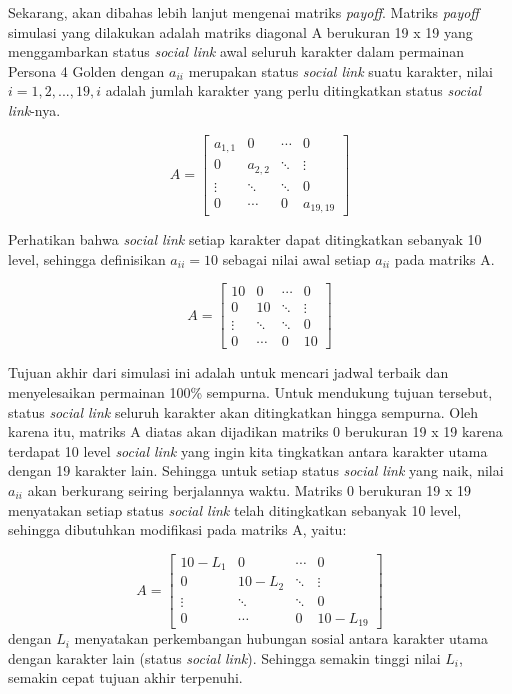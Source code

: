Sekarang, akan dibahas lebih lanjut mengenai matriks \textit{payoff}. Matriks \textit{payoff} simulasi yang dilakukan adalah matriks diagonal A berukuran 19 x 19 yang menggambarkan status \textit{social link} awal seluruh karakter dalam permainan Persona 4 Golden dengan $a_{ii}$ merupakan status \textit{social link} suatu karakter, nilai $i = 1,2,...,19, i$ adalah jumlah karakter yang perlu ditingkatkan status \textit{social link}-nya.

\[
    A =
    \begin{bmatrix}
        a_{1,1} & 0       & \cdots & 0         \\
        0       & a_{2,2} & \ddots & \vdots    \\
        \vdots  & \ddots  & \ddots & 0         \\
        0       & \cdots  & 0      & a_{19,19}
    \end{bmatrix}
\]

Perhatikan bahwa \textit{social link} setiap karakter dapat ditingkatkan sebanyak 10 level, sehingga definisikan $a_{ii}= 10$ sebagai nilai awal setiap $a_{ii}$ pada matriks A.

\[
    A =
    \begin{bmatrix}
        10     & 0      & \cdots & 0      \\
        0      & 10     & \ddots & \vdots \\
        \vdots & \ddots & \ddots & 0      \\
        0      & \cdots & 0      & 10
    \end{bmatrix}
\]

Tujuan akhir dari simulasi ini adalah untuk mencari jadwal terbaik dan menyelesaikan permainan 100\% sempurna. Untuk mendukung tujuan tersebut, status \textit{social link} seluruh karakter akan ditingkatkan hingga sempurna. Oleh karena itu, matriks A diatas akan dijadikan matriks 0 berukuran 19 x 19 karena terdapat 10 level \textit{social link} yang ingin kita tingkatkan antara karakter utama dengan 19 karakter lain. Sehingga untuk setiap status \textit{social link} yang naik, nilai $a_{ii}$ akan berkurang seiring berjalannya waktu. Matriks 0 berukuran 19 x 19 menyatakan setiap status \textit{social link} telah ditingkatkan sebanyak 10 level, sehingga dibutuhkan modifikasi pada matriks A, yaitu:

\[
    A =
    \begin{bmatrix}
        10-L_{1} & 0        & \cdots & 0         \\
        0        & 10-L_{2} & \ddots & \vdots    \\
        \vdots   & \ddots   & \ddots & 0         \\
        0        & \cdots   & 0      & 10-L_{19}
    \end{bmatrix}
\]
dengan $L_{i}$ menyatakan perkembangan hubungan sosial antara karakter utama dengan karakter lain (status \textit{social link}). Sehingga semakin tinggi nilai $L_{i}$, semakin cepat tujuan akhir terpenuhi.

